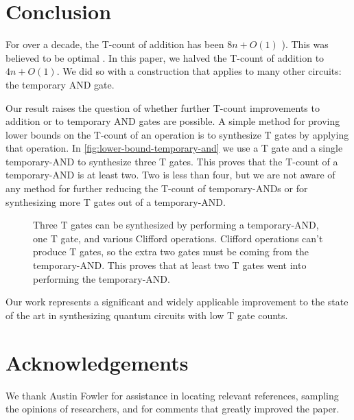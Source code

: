\documentclass[twocolumn,longbibliography]{quantumarticle-customized}
\newcommand{\qT}{\gate{T}}
\newcommand{\qS}{\gate{S}}
\begin{document}
\section{Conclusion}
\label{sec:conclusion}

For over a decade, the T-count of addition has been $8n + O(1)$ \cite{Barenco1995, Cuccaro2004, Amy2013}).
This was believed to be optimal \cite{AustinDiscussionsAndEmails2017}.
In this paper, we halved the T-count of addition to $4n + O(1)$.
We did so with a construction that applies to many other circuits: the temporary AND gate.

Our result raises the question of whether further T-count improvements to addition or to temporary AND gates are possible.
A simple method for proving lower bounds on the T-count of an operation is to synthesize T gates by applying that operation.
In \autoref{fig:lower-bound-temporary-and} we use a T gate and a single temporary-AND to synthesize three T gates.
This proves that the T-count of a temporary-AND is at least two.
Two is less than four, but we are not aware of any method for further reducing the T-count of temporary-ANDs or for synthesizing more T gates out of a temporary-AND.

\begin{figure}
  \resizebox{\linewidth}{!}{
    \Qcircuit @R=0.7em @C=0.7em {
      &\qT &\qw && &&&\ctrl{2}&\qw     &\ctrl{3}&\qw     &\qw &\qw     &\ctrl{3}&\qw     &\ctrl{2}&\qw &\\
      &\qT &\qw &&=&&&\targ   &\ctrl{1}&\qw     &\ctrl{1}&\qw &\ctrl{1}&\qw     &\ctrl{1}&\targ   &\qw &\\
      &\qT &\qw && &&&\targ   &\ctrl{1}&\targ   &\targ   &\qT &\targ   &\targ   &\ctrl{1}&\targ   &\qw &\\
      &    &    && &&&        &        &\targ   &\qw     &\qS &\qw     &\targ   &\qw     &        &    &\\
    }
  }
  \caption{
	Three T gates can be synthesized by performing a temporary-AND, one T gate, and various Clifford operations.
	Clifford operations can't produce T gates, so the extra two gates must be coming from the temporary-AND.
	This proves that at least two T gates went into performing the temporary-AND.
  }
  \label{fig:lower-bound-temporary-and}
\end{figure}

Our work represents a significant and widely applicable improvement to the state of the art in synthesizing quantum circuits with low T gate counts.


\section{Acknowledgements}

We thank Austin Fowler for assistance in locating relevant references, sampling the opinions of researchers, and for comments that greatly improved the paper.




\end{document}
